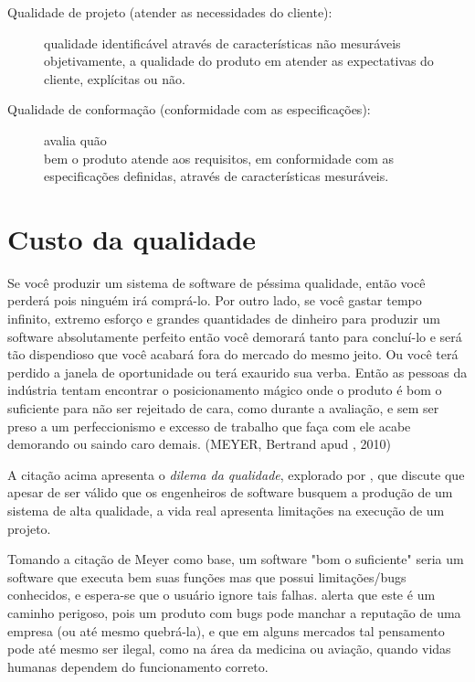 \documentclass[
	12pt,				%
	openright,			%
	oneside,			%
	a4paper,			%
	english,			%
	brazil,				%
	]{abntex2}
\begin{document}
\begin{description}
    \item [Qualidade de projeto (atender as necessidades do cliente):] qualidade identificável através de características não mesuráveis objetivamente, a qualidade do produto em atender as expectativas do cliente, explícitas ou não.
    \item [Qualidade de conformação (conformidade com as especificações):] avalia quão \\ bem o produto atende aos requisitos, em conformidade com as especificações definidas, através de características mesuráveis.
\end{description}

\section{Custo da qualidade}
\begin{citacao} %
Se você produzir um sistema de software de péssima qualidade, então você perderá pois ninguém irá comprá-lo. Por outro lado, se você gastar tempo infinito, extremo esforço e grandes quantidades de dinheiro para produzir um software absolutamente perfeito então você demorará tanto para concluí-lo e será tão dispendioso que você acabará fora do mercado do mesmo jeito. Ou você terá perdido a janela de oportunidade ou terá exaurido sua verba. Então as pessoas da indústria tentam encontrar o posicionamento mágico onde o produto é bom o suficiente para não ser rejeitado de cara, como durante a avaliação, e sem ser preso a um perfeccionismo e excesso de trabalho que faça com ele acabe demorando ou saindo caro demais. (MEYER, Bertrand apud , 2010)
\end{citacao}


A citação acima apresenta o \emph{dilema da qualidade}, explorado por , que discute que apesar de ser válido que os engenheiros de software busquem a produção de um sistema de alta qualidade, a vida real apresenta limitações na execução de um projeto.

Tomando a citação de Meyer como base, um software "bom o suficiente" seria um software que executa bem suas funções mas que possui limitações/bugs conhecidos, e espera-se que o usuário ignore tais falhas.  alerta que este é um caminho perigoso, pois um produto com bugs pode manchar a reputação de uma empresa (ou até mesmo quebrá-la), e que em alguns mercados tal pensamento pode até mesmo ser ilegal, como na área da medicina ou aviação, quando vidas humanas dependem do funcionamento correto.
\end{document}
